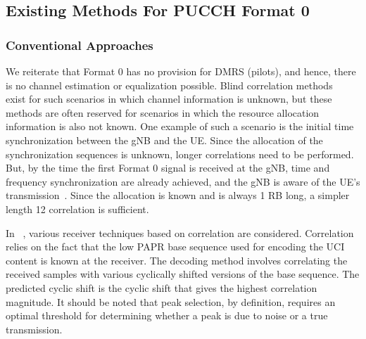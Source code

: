 \documentclass[journal]{IEEEtran}
\begin{document}

\subsection{Existing Methods For PUCCH Format 0}

\subsubsection{Conventional Approaches}
We reiterate that Format 0 has no provision for DMRS (pilots), and hence, there is no channel estimation or equalization possible. Blind correlation methods~\cite{1261943}~\cite{4595664} exist for such scenarios in which channel information is unknown, but these methods are often reserved for scenarios in which the resource allocation information is also not known. One example of such a scenario is the initial time synchronization between the gNB and the UE. Since the allocation of the synchronization sequences is unknown, longer correlations need to be performed. But, by the time the first Format 0 signal is received at the gNB, time and frequency synchronization are already achieved, and the gNB is aware of the UE's transmission~\cite{wahlqvist1996time}. Since the allocation is known and is always 1 RB long, a simpler length 12 correlation is sufficient.

In ~\cite{kim2020performance, tadavarty2021performance, phan2021enhanced}, various receiver techniques based on correlation are considered. Correlation relies on the fact that the low PAPR base sequence used for encoding the UCI content is known at the receiver. The decoding method involves correlating the received samples with various cyclically shifted versions of the base sequence. The predicted cyclic shift is the cyclic shift that gives the highest correlation magnitude. It should be noted that peak selection, by definition, requires an optimal threshold for determining whether a peak is due to noise or a true transmission.  
\end{document}
